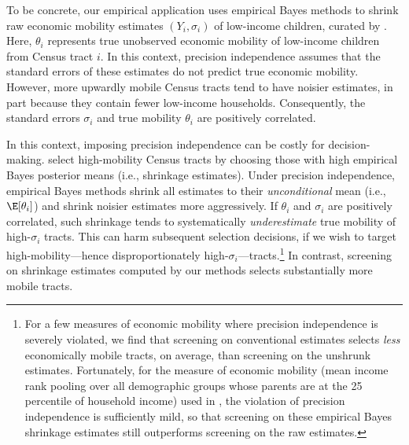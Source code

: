 \documentclass[12pt, reqno]{amsart}
\numberwithin{equation}{section}
\begin{document}
To be concrete, our empirical application \citep{bergman2019creating} uses empirical Bayes
methods to shrink raw economic mobility estimates $(Y_i, \sigma_i)$ of low-income
children, curated by \citet{chetty2018opportunity}. Here, $\theta_i$ represents true
unobserved economic mobility of low-income children from Census tract $i$. In this
context, precision independence assumes that the standard errors of these estimates do not
predict true economic mobility. However, more upwardly mobile Census tracts tend to have
noisier estimates, in part because they contain fewer low-income households. Consequently,
the standard errors $\sigma_i$ and true mobility $\theta_i$ are positively correlated.

In this context, imposing precision independence can be costly for decision-making. 
\citet{bergman2019creating} select high-mobility Census tracts by choosing those with high
 empirical Bayes posterior means (i.e., shrinkage estimates). Under precision
 independence, empirical Bayes methods shrink all estimates to their \emph
 {unconditional} mean (i.e., $\E[\theta_i]$) and shrink noisier estimates more
 aggressively. If $\theta_i$ and $\sigma_i$ are positively correlated, such shrinkage
 tends to systematically
 \emph{underestimate} true mobility of high-$\sigma_i$ tracts. This can harm subsequent
  selection decisions, if we wish to target high-mobility---hence disproportionately
  high-$\sigma_i$---tracts.\footnote{For a few
  measures of economic mobility where precision independence is severely violated, we
  find that screening on conventional estimates selects \emph{less} economically mobile
  tracts, on average, than screening on the unshrunk estimates. Fortunately, for the
  measure of economic mobility (mean income rank pooling over all demographic groups
  whose parents are at the 25\th {} percentile of household income) used in \citet
  {bergman2019creating}, the violation of precision independence is sufficiently mild, so
  that screening on these empirical Bayes shrinkage estimates still outperforms screening
  on the raw estimates. %
} In contrast, screening on shrinkage estimates computed by our methods selects
substantially more mobile tracts.
\end{document}
